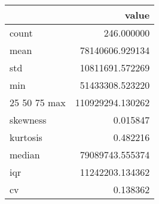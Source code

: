 \begin{tabular}{lr}
\toprule
 & value \\
\midrule
count & 246.000000 \\
mean & 78140606.929134 \\
std & 10811691.572269 \\
min & 51433308.523220 \\
25%
50%
75%
max & 110929294.130262 \\
skewness & 0.015847 \\
kurtosis & 0.482216 \\
median & 79089743.555374 \\
iqr & 11242203.134362 \\
cv & 0.138362 \\
\bottomrule
\end{tabular}
